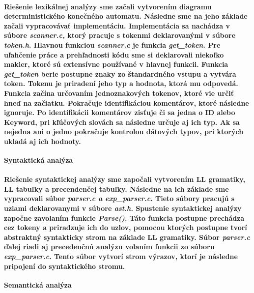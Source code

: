 \documentclass[12pt]{article}
\begin{document}
\paragraph{\indent Riešenie lexikálnej analýzy sme začali vytvorením diagramu deterministického konečného automatu. Následne sme na jeho základe začali vypracovávať implementáciu. Implementácia sa nachádza v súbore \textit{scanner.c,} ktorý pracuje s tokenmi deklarovanými v súbore \textit{token.h}. Hlavnou funkciou \textit{scanner.c} je funkcia \textit{get\_token}. Pre uľahčenie práce a prehľadnosti kódu sme si deklarovali niekoľko makier, ktoré sú extensívne používané v hlavnej funkcii. Funkcia \textit{get\_token} berie postupne znaky zo štandardného vstupu a vytvára token. Tokenu je priradení jeho typ a hodnota, ktorá mu odpovedá. Funkcia začína určovaním jednoznakových tokenov, ktoré vie určiť hneď na začiatku. Pokračuje identifikáciou komentárov, ktoré následne ignoruje. Po identifikácii komentárov zisťuje či sa jedna o ID alebo Keyword, pri kľúčových slovách sa následne určuje aj ich typ. Ak sa nejedna ani o jedno pokračuje kontrolou dátových typov, pri ktorých ukladá aj ich hodnoty.  \newline \\}

 \Large \textbf{Syntaktická analýza}\normalsize \\
\noindent\makebox[\linewidth]{\rule{\textwidth}{0.4pt}}

\paragraph{Riešenie syntaktickej analýzy sme započali vytvorením LL gramatiky, LL tabuľky a precendenčej tabuľky. Následne na ich základe sme vypracovali súbor \textit{parser.c a exp\_parser.c}. Tieto súbory pracujú s uzlami deklarovanymi v súbore \textit{ast.h}. Spustenie syntaktickej analýzy započne zavolaním funkcie \textit{Parse()}. Táto funkcia postupne prechádza cez tokeny a priradzuje ich do uzlov, pomocou ktorých postupne tvorí abstraktný syntakticky strom na základe LL gramatiky. Súbor \textit{parser.c} ďalej riadi aj precedenčnú analýzu volaním funkcii zo súboru \textit{exp\_parser.c}. Tento súbor vytvorí strom výrazov, ktorí je následne pripojení do syntaktického stromu.  \newline \\}

 \Large \textbf{Semantická analýza}\normalsize \\
\noindent\makebox[\linewidth]{\rule{\textwidth}{0.4pt}}
\end{document}
